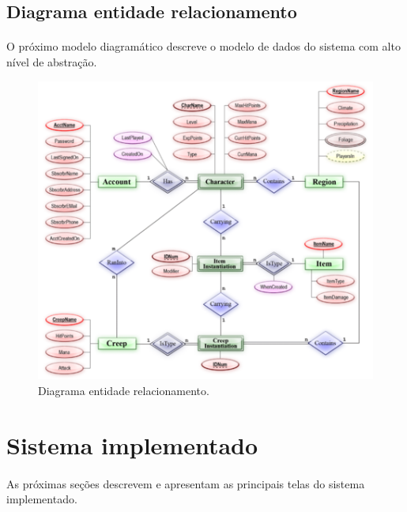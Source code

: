 \documentclass[11pt]{article}
\begin{document}
  \clearpage
  
    \subsection{Diagrama entidade relacionamento}
    
    \paragraph{}
    O próximo modelo diagramático descreve o modelo de dados do sistema
    com alto nível de abstração.

      \begin{figure}[h!]
        \centering
        \includegraphics[width=1.0\textwidth]{er.png}
        \caption{Diagrama entidade relacionamento.}
      \end{figure}
        
  \clearpage
  
  \section{Sistema implementado}
    
    \paragraph{}
    
    As próximas seções descrevem e apresentam as principais telas do sistema implementado. 
    
\end{document}
